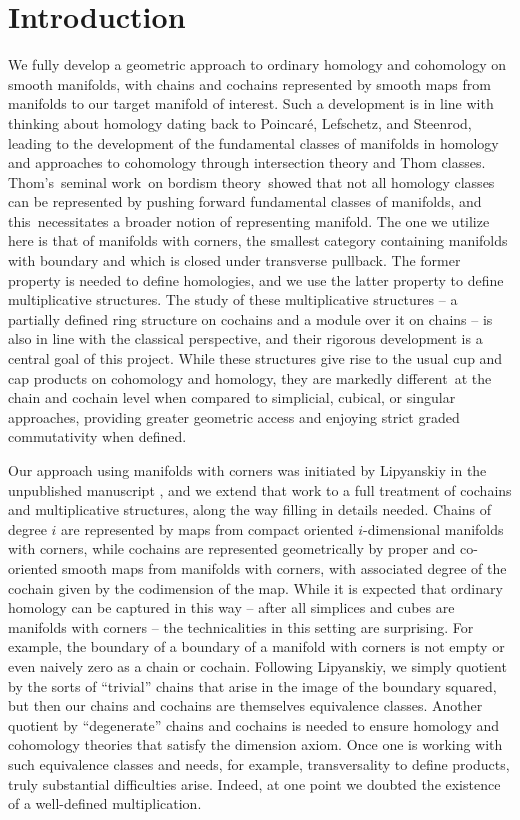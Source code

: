 

\section{Introduction}\label{S: introduction}

We fully develop a geometric approach to ordinary homology and cohomology on smooth manifolds, with chains and cochains represented by smooth maps from manifolds to our target manifold of interest.
Such a development is in line with thinking about homology dating back to Poincar\'e, Lefschetz, and Steenrod, leading to the development of the fundamental classes of manifolds in homology and approaches to cohomology through intersection theory and Thom classes.
Thom's seminal work on bordism theory showed that not all homology classes can be represented by pushing forward fundamental classes of manifolds, and this necessitates a broader notion of representing manifold.
The one we utilize here is that of manifolds with corners, the smallest category containing manifolds with boundary and which is closed under transverse pullback.
The former property is needed to define homologies, and we use the latter property to define multiplicative structures.
The study of these multiplicative structures -- a partially defined ring structure on cochains and a module over it on chains -- is also in line with the classical perspective, and their rigorous development is a central goal of this project.
While these structures give rise to the usual cup and cap products on cohomology and homology, they are markedly different at the chain and cochain level when compared to simplicial, cubical, or singular approaches, providing greater geometric access and enjoying strict graded commutativity when defined.

Our approach using manifolds with corners was initiated by Lipyanskiy in the unpublished manuscript \cite{Lipy14}, and we extend that work to a full treatment of cochains and multiplicative structures, along the way filling in details needed.
Chains of degree $i$ are represented by maps from compact oriented $i$-dimensional manifolds with corners, while cochains are represented geometrically by proper and co-oriented smooth maps from manifolds with corners, with associated degree of the cochain given by the codimension of the map.
While it is expected that ordinary homology can be captured in this way -- after all simplices and cubes are manifolds with corners -- the technicalities in this setting are surprising.
For example, the boundary of a boundary of a manifold with corners is not empty or even naively zero as a chain or cochain.
Following Lipyanskiy, we simply quotient by the sorts of ``trivial'' chains that arise in the image of the boundary squared, but then our chains and cochains are themselves equivalence classes.
Another quotient by ``degenerate'' chains and cochains is needed to ensure homology and cohomology theories that satisfy the dimension axiom.
Once one is working with such equivalence classes and needs, for example, transversality to define products, truly substantial difficulties arise.
Indeed, at one point we doubted the existence of a well-defined multiplication.

